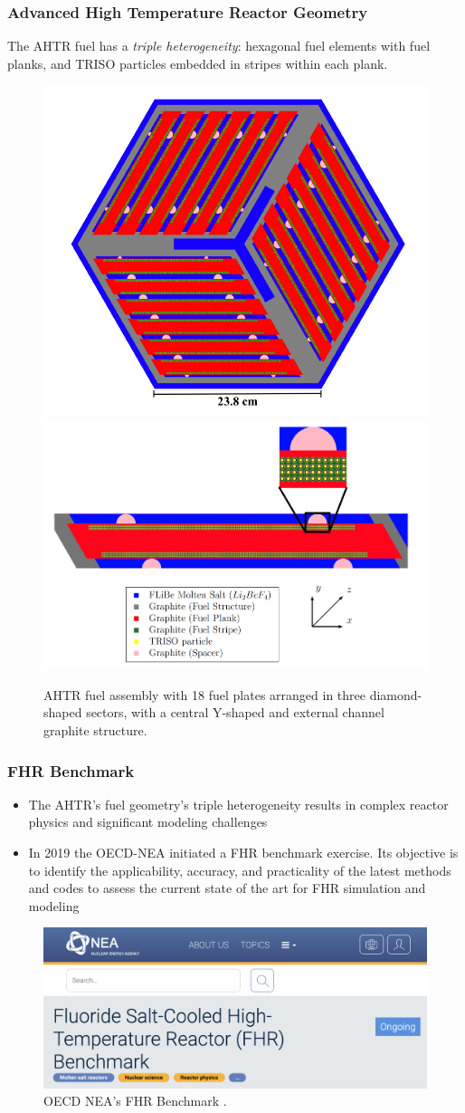 \begin{frame}
  \frametitle{Advanced High Temperature Reactor Geometry}
  The AHTR fuel has a \emph{triple heterogeneity}: hexagonal fuel elements with 
  fuel planks, and TRISO particles embedded in stripes within each plank.
  \begin{figure}[]
    \includegraphics[width=0.5\linewidth]{figures/ahtr-assembly.png} 
    \includegraphics[width=0.5\linewidth]{figures/ahtr-plank.png} 
    \caption{AHTR fuel assembly with 18 fuel plates arranged in 
    three diamond-shaped sectors, with a central Y-shaped and external channel 
    graphite structure.}
\end{figure}
\end{frame}

\begin{frame}
  \frametitle{FHR Benchmark}
  \begin{itemize}
    \item The AHTR's fuel geometry's triple heterogeneity results in
    complex reactor physics and significant modeling challenges
    \item In 2019 the OECD-NEA initiated a FHR benchmark exercise. Its objective 
    is to identify the applicability, accuracy, and practicality of the latest 
    methods and codes to assess the current state of the art for FHR simulation 
    and modeling
  \end{itemize}
  \begin{figure}[]
    \includegraphics[width=0.7\linewidth]{figures/benchmark.png} 
    \caption{OECD NEA's FHR Benchmark \cite{petrovic_benchmark_2021}.}
\end{figure}
\end{frame}
